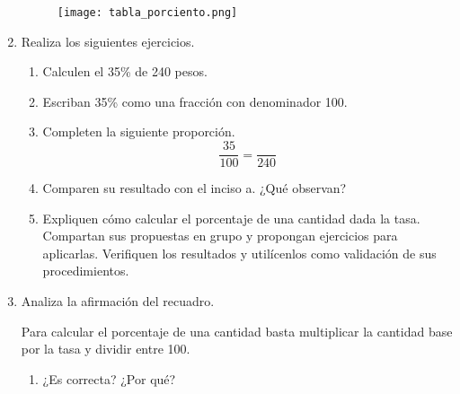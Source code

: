 \documentclass[11pt]{book}
\begin{document}
\begin{enumerate}
        \begin{figure}[H]
          \centering
          \texttt{[image: tabla\_porciento.png]}
          \label{fig:tabla_porciento}
        \end{figure}
  \item Realiza los siguientes ejercicios.
        \begin{enumerate}
          \item Calculen el 35\% de 240 pesos.
          \item Escriban 35\% como una fracción con denominador 100.
          \item Completen la siguiente proporción.
                \[\dfrac{35}{100} = \dfrac{}{240}\]
          \item Comparen su resultado con el inciso a. ¿Qué observan?
          \item Expliquen cómo calcular el porcentaje de una cantidad dada la tasa. Compartan
                sus propuestas en grupo y propongan ejercicios para aplicarlas. Verifiquen los
                resultados y utilícenlos como validación de sus procedimientos.
        \end{enumerate}
  \item Analiza la afirmación del recuadro.
        \begin{boxH}
          Para calcular el porcentaje de una cantidad basta multiplicar la cantidad base por
          la tasa y dividir entre 100.
        \end{boxH}
        \begin{enumerate}
          \item ¿Es correcta? ¿Por qué?
        \end{enumerate}
\end{enumerate}
\end{document}
